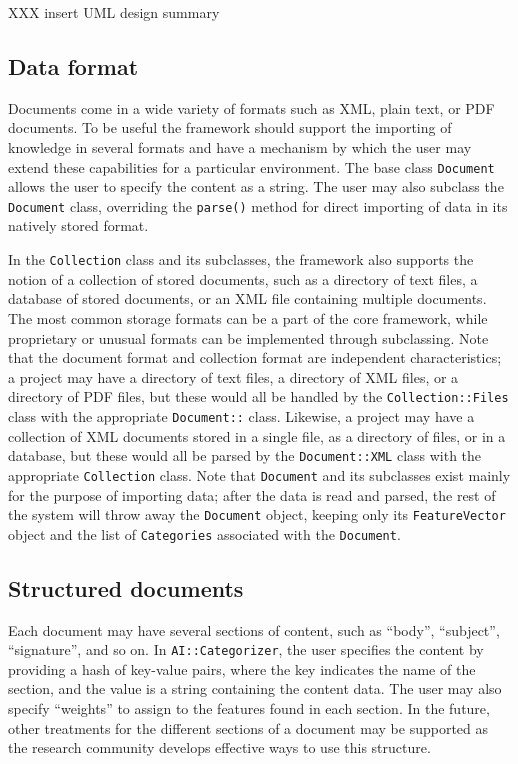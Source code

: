 \documentclass[a4paper,twocolumn]{article}
\begin{document}
XXX insert UML design summary


\subsection{Data format}
Documents come in a wide variety of formats such as XML, plain text,
or PDF documents.  To be useful the framework should support the
importing of knowledge in several formats and have a mechanism by
which the user may extend these capabilities for a particular
environment.  The base class \texttt{Document} allows the user to
specify the content as a string.  The user may also subclass the
\texttt{Document} class, overriding the \texttt{parse()} method for
direct importing of data in its natively stored format.

In the \texttt{Collection} class and its subclasses, the framework
also supports the notion of a collection of stored documents, such as
a directory of text files, a database of stored documents, or an XML
file containing multiple documents.  The most common storage formats
can be a part of the core framework, while proprietary or unusual
formats can be implemented through subclassing.  Note that the
document format and collection format are independent characteristics;
a project may have a directory of text files, a directory of XML
files, or a directory of PDF files, but these would all be handled by
the \texttt{Collection::Files} class with the appropriate
\texttt{Document::} class.  Likewise, a project may have a collection
of XML documents stored in a single file, as a directory of files, or
in a database, but these would all be parsed by the
\texttt{Document::XML} class with the appropriate \texttt{Collection}
class. Note that \texttt{Document} and its subclasses exist mainly for
the purpose of importing data; after the data is read and parsed, the
rest of the system will throw away the \texttt{Document} object,
keeping only its \texttt{FeatureVector} object and the list of
\texttt{Categories} associated with the \texttt{Document}.

\subsection{Structured documents}
Each document may have several sections of content, such as ``body'',
``subject'', ``signature'', and so on.  In \texttt{AI::Categorizer},
the user specifies the content by providing a hash of key-value pairs,
where the key indicates the name of the section, and the value is a
string containing the content data.  The user may also specify
``weights'' to assign to the features found in each section.  In the
future, other treatments for the different sections of a document may
be supported as the research community develops effective ways to use
this structure.
\end{document}
